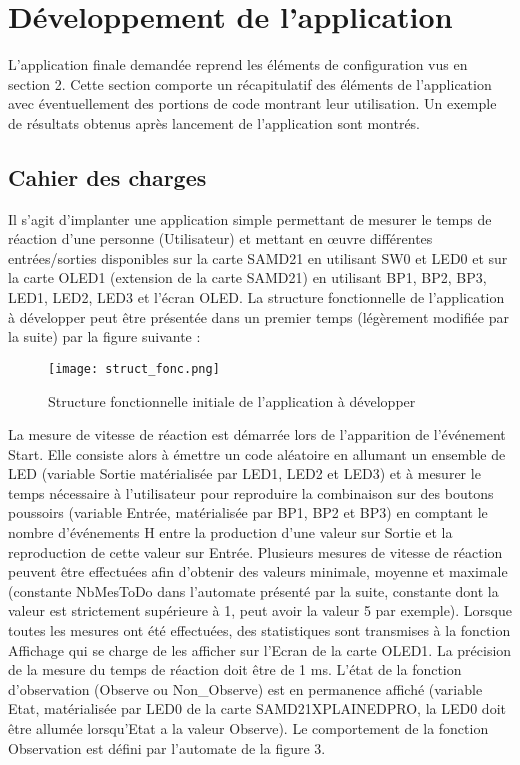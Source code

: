 \section{Développement de l'application}

L'application finale demandée reprend les éléments de configuration vus en section 2.
Cette section comporte un récapitulatif des éléments de l'application avec éventuellement des portions de code montrant leur utilisation.
Un exemple de résultats obtenus après lancement de l'application sont montrés.

\subsection{Cahier des charges}

Il s'agit d'implanter une application simple permettant de mesurer le temps de réaction d'une personne (Utilisateur) et mettant en œuvre différentes entrées/sorties disponibles sur la carte SAMD21 en utilisant SW0 et LED0 et sur la carte OLED1 (extension de la carte SAMD21) en utilisant BP1, BP2, BP3, LED1, LED2, LED3 et l'écran OLED.
La structure fonctionnelle de l'application à développer peut être présentée dans un premier temps (légèrement modifiée par la suite) par la figure suivante :

\begin{figure}[h]
    \centering
    \texttt{[image: struct\_fonc.png]}
    \caption{Structure fonctionnelle initiale de l'application à développer}
    \label{fig:struct}
\end{figure}

La mesure de vitesse de réaction est démarrée lors de l'apparition de l'événement Start.
Elle consiste alors à émettre un code aléatoire en allumant un ensemble de LED (variable Sortie matérialisée par LED1, LED2 et LED3) et à mesurer le temps nécessaire à l'utilisateur pour reproduire la combinaison sur des boutons poussoirs (variable Entrée, matérialisée par BP1, BP2 et BP3) en comptant le nombre d'événements H entre la production d'une valeur sur Sortie et la reproduction de cette valeur sur Entrée. 
Plusieurs mesures de vitesse de réaction peuvent être effectuées afin d'obtenir des valeurs minimale, moyenne et maximale (constante NbMesToDo dans l'automate présenté par la suite, constante dont la valeur est strictement supérieure à 1, peut avoir la valeur 5 par exemple).
Lorsque toutes les mesures ont été effectuées, des statistiques sont transmises à la fonction Affichage qui se charge de les afficher sur l'Ecran de la carte OLED1.
La précision de la mesure du temps de réaction doit être de 1 ms.
L'état de la fonction d'observation (Observe ou Non\_Observe) est en permanence affiché (variable Etat, matérialisée par LED0 de la carte SAMD21XPLAINEDPRO, la LED0 doit être allumée lorsqu'Etat a la valeur Observe).
Le comportement de la fonction Observation est défini par l'automate de la figure 3.


